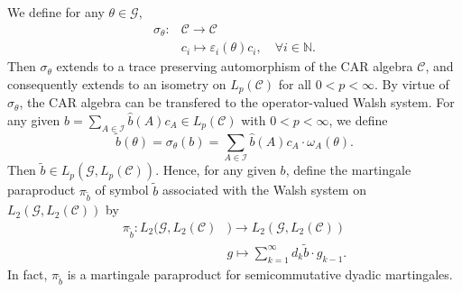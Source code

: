 \documentclass[oneside,english,a4wide]{amsart}
\numberwithin{equation}{section}
\numberwithin{figure}{section}
\theoremstyle{plain}
\theoremstyle{plain}
\theoremstyle{definition}
\theoremstyle{plain}
\theoremstyle{remark}
\theoremstyle{definition}
\theoremstyle{remark}
\theoremstyle{definition}
\newcommand{\8}{\infty}
\begin{document}
	We define for any $\theta\in \mathcal{G}$,
	\begin{equation*}
		\begin{aligned}
			\sigma_\theta:{}&\mathcal{C}\to \mathcal{C}\\&
			c_i\mapsto \varepsilon_i(\theta)c_i,\quad \forall i\in\mathbb{N}.
		\end{aligned}
	\end{equation*}
	Then $\sigma_\theta$ extends to a trace preserving automorphism of the CAR algebra $\mathcal{C}$, and consequently extends to an isometry on $L_p(\mathcal{C})$ for all $0< p< \infty$. By virtue of $	\sigma_\theta$, the CAR algebra can be transfered to the operator-valued Walsh system. For any given $b=\sum\limits_{A\in\mathcal{I}}\hat{b}(A)c_A\in L_p(\mathcal{C})$ with $0<p<\8$, we define 
	\[\tilde b(\theta)=\sigma_\theta(b)=\sum_{A\in\mathcal{I}}\hat{b}(A)c_A\cdot\omega_A(\theta).\]
	Then $\tilde{b}\in L_p(\mathcal{G},L_p(\mathcal{C}))$. Hence, for any given $b$,  define the martingale paraproduct $\pi_{\tilde{b}}$ of symbol $\tilde{b}$ associated with the Walsh system  on $L_2(\mathcal{G},L_2(\mathcal{C}))$ by
	\begin{equation*}
		\begin{aligned}
			\pi_{\tilde{b}}:L_2(\mathcal{G},L_2(\mathcal{C}){}&)\to L_2(\mathcal{G},L_2(\mathcal{C}))\\&
			g\mapsto \sum_{k=1}^\infty d_k\tilde{b}\cdot g_{k-1}.
		\end{aligned}
	\end{equation*}
	In fact, $	\pi_{\tilde{b}}$ is a martingale paraproduct for semicommutative dyadic martingales.
	
\end{document}
